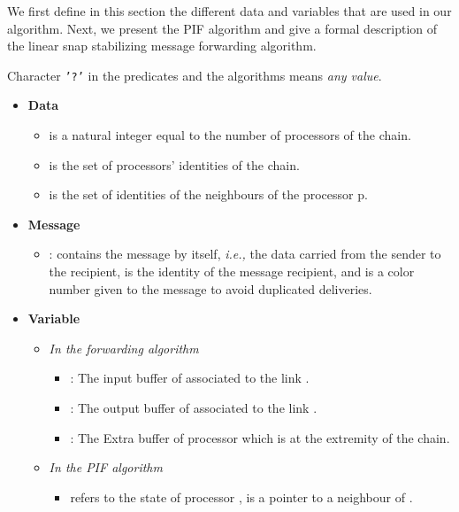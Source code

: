 \documentclass{llncs}
\newcommand{\ie}{\emph{i.e., }}
\begin{document}
We first define in this section the different data and variables that are used in our algorithm. Next, we present the
PIF algorithm and give a formal description of the linear snap stabilizing message forwarding algorithm.

Character {\tt '?'} in the predicates and the algorithms means {\em any value}.


\begin{itemize}
\item \textbf{Data}
           \begin{itemize}
            \item  is a natural integer equal to the number of processors of the chain. 
            \item  is the set of processors' identities of the chain. 
            \item  is the set of identities of the neighbours of the processor p.   
           \end{itemize}
  \item \textbf{Message}
            \begin{itemize}
             \item :  contains the message by itself, \ie the data carried from the sender to the recipient,
                    is the identity of the message recipient, and
                    is a color number given to the message to avoid duplicated deliveries.
             \end{itemize}

  \item \textbf{Variable}
             \begin{itemize}
              \item \textit{In the forwarding algorithm}
                        \begin{itemize}
                         \item : The input buffer of  associated to the link .
                         \item : The output buffer of  associated to the link .
                         \item : The Extra buffer of processor  which is at the extremity of the chain.
                         \end{itemize}
             \item{\textit{ In the PIF algorithm}}
                          \begin{itemize}
                            \item  refers to the state of processor ,  is a pointer
to a neighbour of .\\
                           \end{itemize}
            \end{itemize}
            

\end{itemize}
\end{document}
